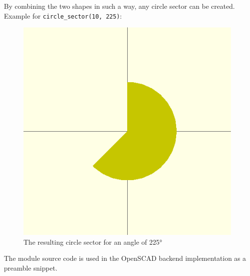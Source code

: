 \noindent By combining the two shapes in such a way, any circle sector can be
created. Example for \texttt{circle\_sector(10, 225)}:

\begin{figure}[H]
	\centering
	\includegraphics[width=.70\textwidth]{images/cs_225_result}
	\caption{The resulting circle sector for an angle of 225\si{\degree}}
	\label{img:circle_shape_result}
\end{figure}

\noindent The module source code is used in the OpenSCAD backend implementation
as a preamble snippet.
